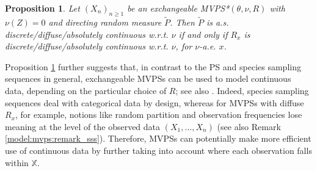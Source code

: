 \documentclass[a4paper]{article}
\theoremstyle{plain}
\newtheorem{proposition}[theorem]{Proposition}
\theoremstyle{remark}
\theoremstyle{definition}
\begin{document}
\begin{proposition}\label{introProp_1}
Let $(X_n)_{n\geq1}$ be an exchangeable MVPS*$(\theta,\nu,R)$ with $\nu(Z)=0$ and directing random measure $\tilde{P}$. Then $\tilde{P}$ is a.s. discrete/diffuse/absolutely continuous w.r.t. $\nu$ if and only if $R_x$ is discrete/diffuse/absolutely continuous w.r.t. $\nu$, for $\nu$-a.e. $x$.
\end{proposition}

Proposition \ref{introProp_1} further suggests that, in contrast to the PS and species sampling sequences in general, exchangeable MVPSs can be used to model continuous data, depending on the particular choice of $R$; see also \citet[p.\,3-4]{sariev2023sufficientness}. Indeed, species sampling sequences deal with categorical data by design, whereas for MVPSs with diffuse $R_x$, for example, notions like random partition and observation frequencies lose meaning at the level of the observed data $(X_1,\ldots,X_n)$ (see also Remark \ref{model:mvps:remark_sss}). Therefore, MVPSs can potentially make more efficient use of continuous data by further taking into account where each observation falls within $\mathbb{X}$.
\end{document}
